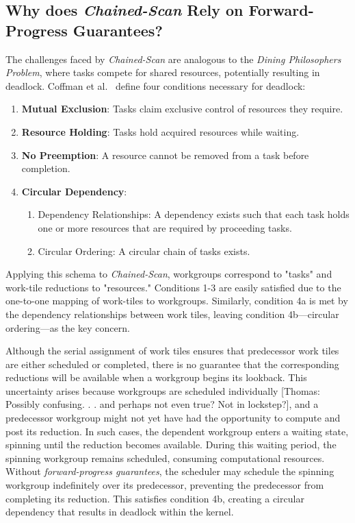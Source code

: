 \documentclass[sigconf]{acmart}
\newcommand{\thomas}[1]{{\footnotesize\color{orange}[Thomas: #1]}}
\begin{document}
\subsection{Why does \emph{Chained-Scan} Rely on Forward-Progress Guarantees?}
The challenges faced by \emph{Chained-Scan} are analogous to the \emph{Dining Philosophers Problem}, where tasks compete for shared resources, potentially resulting in deadlock. Coffman et al.~\cite{10.1145/356586.356588} define four conditions necessary for deadlock:
\begin{enumerate}
  \item \textbf{Mutual Exclusion}: Tasks claim exclusive control of resources they require.
  \item \textbf{Resource Holding}: Tasks hold acquired resources while waiting.
  \item \textbf{No Preemption}: A resource cannot be removed from a task before completion.
  \item \textbf{Circular Dependency}:
  \begin{enumerate}
    \item Dependency Relationships: A dependency exists such that each task holds one or more resources that are required by proceeding tasks.
    \item Circular Ordering: A circular chain of tasks exists.
  \end{enumerate}
\end{enumerate}
Applying this schema to \emph{Chained-Scan}, workgroups correspond to "tasks" and work-tile reductions to "resources." Conditions 1-3 are easily satisfied due to the one-to-one mapping of work-tiles to workgroups. Similarly, condition 4a is met by the dependency relationships between work tiles, leaving condition 4b---circular ordering---as the key concern.

Although the serial assignment of work tiles ensures that predecessor work tiles are either scheduled or completed, there is no guarantee that the corresponding reductions will be available when a workgroup begins its lookback. This uncertainty arises because workgroups are scheduled individually \thomas{Possibly confusing. . . and perhaps not even true? Not in lockstep?}, and a predecessor workgroup might not yet have had the opportunity to compute and post its reduction. In such cases, the dependent workgroup enters a waiting state, spinning until the reduction becomes available. During this waiting period, the spinning workgroup remains scheduled, consuming computational resources. Without \emph{forward-progress guarantees}, the scheduler may schedule the spinning workgroup indefinitely over its predecessor, preventing the predecessor from completing its reduction. This satisfies condition 4b, creating a circular dependency that results in deadlock within the kernel.
\end{document}
